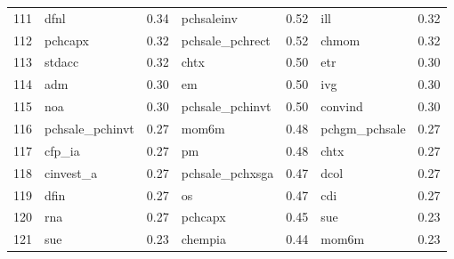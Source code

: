 \begin{footnotesize}
\begin{longtable}{rlc|lc|lc}
		111                       & dfnl                        & 0.34                          & pchsaleinv                  & 0.52                          & ill                               & 0.32           \\
		112                       & pchcapx                     & 0.32                          & pchsale\_pchrect            & 0.52                          & chmom                             & 0.32           \\
		113                       & stdacc                      & 0.32                          & chtx                        & 0.50                          & etr                               & 0.30           \\
		114                       & adm                         & 0.30                          & em                          & 0.50                          & ivg                               & 0.30           \\
		115                       & noa                         & 0.30                          & pchsale\_pchinvt            & 0.50                          & convind                           & 0.30           \\
		116                       & pchsale\_pchinvt            & 0.27                          & mom6m                       & 0.48                          & pchgm\_pchsale                    & 0.27           \\
		117                       & cfp\_ia                     & 0.27                          & pm                          & 0.48                          & chtx                              & 0.27           \\
		118                       & cinvest\_a                  & 0.27                          & pchsale\_pchxsga            & 0.47                          & dcol                              & 0.27           \\
		119                       & dfin                        & 0.27                          & os                          & 0.47                          & cdi                               & 0.27           \\
		120                       & rna                         & 0.27                          & pchcapx                     & 0.45                          & sue                               & 0.23           \\
		121                       & sue                         & 0.23                          & chempia                     & 0.44                          & mom6m                             & 0.23           \\

\end{longtable}
\end{footnotesize}
